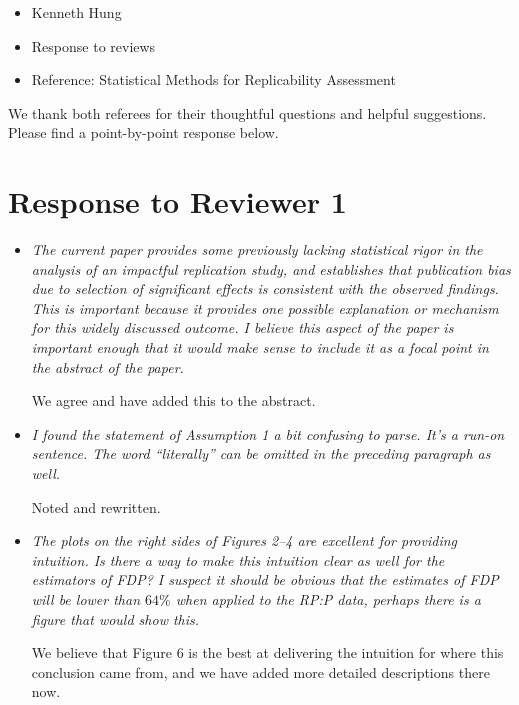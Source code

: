 \documentclass[]{article}
\theoremstyle{remark}
\begin{document}
\begin{itemize}

\item Kenneth Hung
\item Response to reviews
\item Reference: Statistical Methods for Replicability Assessment

\end{itemize}

We thank both referees for their thoughtful questions and helpful suggestions. Please find a point-by-point response below.

\section{Response to Reviewer 1}

\begin{itemize}

\item {\em The current paper provides some previously lacking statistical rigor in the analysis of an impactful replication study, and establishes that publication bias due to selection of significant effects is consistent with the observed findings. This is important because it provides one possible explanation or mechanism for this widely discussed outcome. I believe this aspect of the paper is important enough that it would make sense to include it as a focal point in the abstract of the paper.}

We agree and have added this to the abstract.

\item {\em I found the statement of Assumption 1 a bit confusing to parse. It’s a run-on sentence. The word ``literally'' can be omitted in the preceding paragraph as well.}

Noted and rewritten.

\item {\em The plots on the right sides of Figures 2--4 are excellent for providing intuition. Is there a way to make this intuition clear as well for the estimators of FDP? I suspect it should be obvious that the estimates of FDP will be lower than $64\%$ when applied to the RP:P data, perhaps there is a figure that would show this.}

We believe that Figure 6 is the best at delivering the intuition for where this conclusion came from, and we have added more detailed descriptions there now.

\end{itemize}
\end{document}
